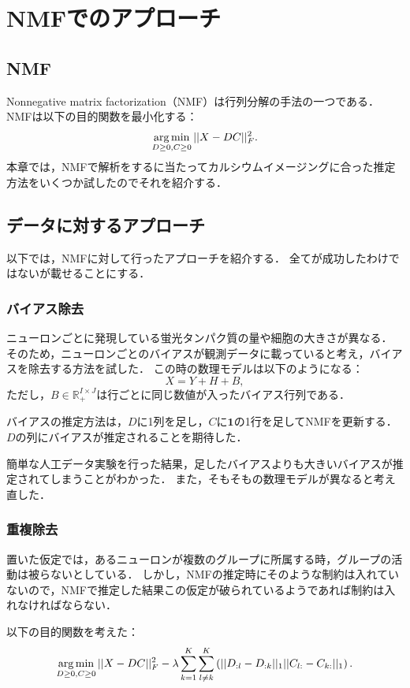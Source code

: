 \section{NMFでのアプローチ}
\subsection{NMF}
Nonnegative matrix factorization（NMF）は行列分解の手法の一つである．
NMFは以下の目的関数を最小化する：
\begin{equation}
	\operatorname*{arg\,min}_{D \geq 0, C \geq 0} ||X - DC||_F^2.
  \label{eq:NMF}
\end{equation}
本章では，NMFで解析をするに当たってカルシウムイメージングに合った推定方法をいくつか試したのでそれを紹介する．

\subsection{データに対するアプローチ}
以下では，NMFに対して行ったアプローチを紹介する．
全てが成功したわけではないが載せることにする．
\subsubsection{バイアス除去}
ニューロンごとに発現している蛍光タンパク質の量や細胞の大きさが異なる．
そのため，ニューロンごとのバイアスが観測データに載っていると考え，バイアスを除去する方法を試した．
この時の数理モデルは以下のようになる：
\begin{equation}
	X = Y + H + B,
\end{equation}
ただし，$B \in \mathbb{R}_+^{I\times J}$は行ごとに同じ数値が入ったバイアス行列である．

バイアスの推定方法は，$D$に1列を足し，$C$に$\mathbf 1$の1行を足してNMFを更新する．
$D$の列にバイアスが推定されることを期待した．

簡単な人工データ実験を行った結果，足したバイアスよりも大きいバイアスが推定されてしまうことがわかった．
また，そもそもの数理モデルが異なると考え直した．


\subsubsection{重複除去}
置いた仮定では，あるニューロンが複数のグループに所属する時，グループの活動は被らないとしている．
しかし，NMFの推定時にそのような制約は入れていないので，NMFで推定した結果この仮定が破られているようであれば制約は入れなければならない．

以下の目的関数を考えた：
\begin{eqnarray}
	\operatorname*{arg\,min}_{D \geq 0, C \geq 0} ||X - DC||_F^2 - \lambda \sum_{k=1}^K \sum_{l \neq k}^K \left( || D_{:l} - D_{:k} ||_1 || C_{l:} - C_{k:} ||_1 \right).
  \label{eq:overlap}
\end{eqnarray}

